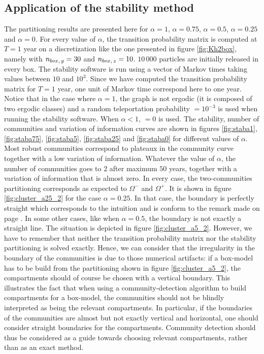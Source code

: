 \subsection{Application of the stability method}
The partitioning results are presented here for $\alpha = 1$, $\alpha = 0.75$, $\alpha = 0.5$, $\alpha = 0.25$ and $\alpha = 0$. For every value of $\alpha$, the transition probability matrix is computed at $T = 1$ year on a discretization like the one presented in figure \ref{fig:Kh2box}, namely with $n_{box,\,y} = 30$ and $n_{box,\,z} = 10$. $10\,000$ particles are initially released in every box. The stability software is run using a vector of Markov times taking values between $10$ and $10^3$. Since we have computed the transition probability matrix for $T = 1$ year, one unit of Markov time correspond here to one year. Notice that in the case where $\alpha = 1$, the graph is not ergodic (it is composed of two ergodic classes) and a random teleportation probability  $= 10^{-3}$ is used when running the stability software. When $\alpha < 1$,  $=0$ is used.
The stability, number of communities and variation of information curves are shown in figures \ref{fig:staba1}, \ref{fig:staba75}, \ref{fig:staba5}, \ref{fig:staba25} and \ref{fig:staba0} for different values of $\alpha$. Most robust communities correspond to plateaux in the community curve together with a low variation of information. Whatever the value of $\alpha$, the number of communities goes to $2$ after maximum $50$ years, together with a variation of information that is almost zero. In every case, the two-communities partitioning corresponds as expected to $\Omega^-$ and $\Omega^+$. It is shown in figure \ref{fig:cluster_a25_2} for the case $\alpha = 0.25$. In that case, the boundary is perfectly straight which corresponds to the intuition and is conform to the remark made on page \pageref{remark:straightboundaries}. In some other cases, like when $\alpha = 0.5$, the boundary is not exactly a straight line. The situation is depicted in figure \ref{fig:cluster_a5_2}. However, we have to remember that neither the transition probability matrix nor the stability partitioning is solved exactly. Hence, we can consider that the irregularity in the boundary of the communities is due to those numerical artifacts: if a box-model has to be build from the partitioning shown in figure \ref{fig:cluster_a5_2}, the compartments should of course be chosen with a vertical boundary. This illustrates the fact that when using a community-detection algorithm to build compartments for a box-model, the communities should not be blindly interpreted as being the relevant compartments. In particular, if the boundaries of the communities are almost but not exactly vertical and horizontal, one should consider straight boundaries for the compartments. Community detection should thus be considered as a guide towards choosing relevant compartments, rather than as an exact method.

